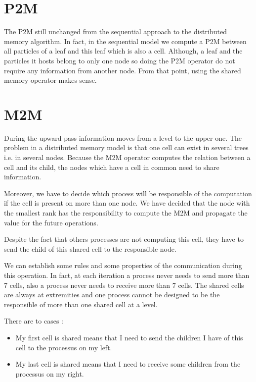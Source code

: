 \documentclass[12pt,letterpaper,titlepage]{report}
\begin{document}
\section{P2M}
The P2M still unchanged from the sequential approach to the
distributed memory algorithm.  In fact, in the sequential model we
compute a P2M between all particles of a leaf and this leaf which is
also a cell.  Although, a leaf and the particles it hosts belong to
only one node so doing the P2M operator do not require any information
from another node.  From that point, using the shared memory operator
makes sense.

\clearpage
\section{M2M}
During the upward pass information moves from a level to the upper
one.  The problem in a distributed memory model is that one cell can
exist in several trees i.e. in several nodes.  Because the M2M
operator computes the relation between a cell and its child, the nodes
which have a cell in common need to share information.

Moreover, we have to decide which process will be responsible of the
computation if the cell is present on more than one node.  We have
decided that the node with the smallest rank has the responsibility to
compute the M2M and propagate the value for the future operations.

Despite the fact that others processes are not computing this cell,
they have to send the child of this shared cell to the responsible
node.

We can establish some rules and some properties of the communication
during this operation.  In fact, at each iteration a process never
needs to send more than 7 cells, also a process never needs to receive
more than 7 cells.  The shared cells are always at extremities and one
process cannot be designed to be the responsible of more than one
shared cell at a level. 

There are to cases : 
\begin{itemize}
\item My first cell is shared means that I need to send the children I have of
  this cell to the processus on my left.
\item My last cell is shared means that I need to receive some
  children from the processus on my right.
\end{itemize}
\end{document}
